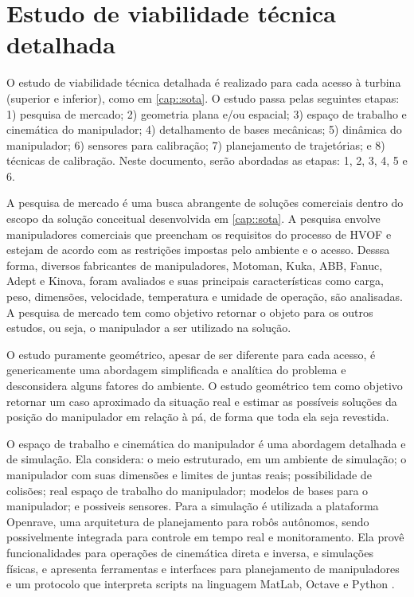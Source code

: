 \section{Estudo de viabilidade técnica detalhada}\label{sec::viatec} 

O estudo de viabilidade técnica detalhada é realizado para cada acesso à turbina
(superior e inferior), como em \ref{cap::sota}. O estudo passa pelas
seguintes etapas: 1) pesquisa de mercado; 2) geometria plana e/ou espacial; 3)
espaço de trabalho e cinemática do manipulador; 4) detalhamento de
bases mecânicas; 5) dinâmica do manipulador; 6) sensores para calibração; 7)
planejamento de trajetórias; e 8) técnicas de calibração.
Neste documento, serão abordadas as etapas: 1, 2, 3, 4, 5 e 6.

A pesquisa de mercado é uma busca abrangente de soluções comerciais dentro do
escopo da solução conceitual desenvolvida em \ref{cap::sota}. A pesquisa envolve
manipuladores comerciais que preencham os requisitos do processo de HVOF e
estejam de acordo com as restrições impostas pelo ambiente e o acesso. Desssa
forma, diversos fabricantes de manipuladores, Motoman, Kuka, ABB, Fanuc,
Adept e Kinova, foram avaliados e suas principais características como carga,
peso, dimensões, velocidade, temperatura e umidade de operação, são analisadas.
A pesquisa de mercado tem como objetivo retornar o objeto para os outros
estudos, ou seja, o manipulador a ser utilizado na solução.

O estudo puramente geométrico, apesar de ser diferente para cada acesso, é
genericamente uma abordagem simplificada e analítica do problema e desconsidera
alguns fatores do ambiente. O estudo geométrico tem como objetivo retornar um caso
aproximado da situação real e estimar as possíveis soluções da posição do
manipulador em relação à pá, de forma que toda ela seja revestida.

O espaço de trabalho e cinemática do manipulador é uma abordagem
detalhada e de simulação. Ela considera: o meio estruturado, em um ambiente de
simulação; o manipulador com suas dimensões e limites de juntas reais;
possibilidade de colisões; real espaço de trabalho do manipulador; modelos de
bases para o manipulador; e possiveis sensores. Para a simulação é utilizada a
plataforma Openrave, uma arquitetura de planejamento para robôs autônomos,
sendo possivelmente integrada para controle em tempo real e monitoramento.
Ela provê funcionalidades para operações de cinemática direta e inversa, e
simulações físicas, e apresenta ferramentas e interfaces para planejamento de
manipuladores e um protocolo que interpreta scripts na linguagem MatLab, Octave
e Python \citep{diankov2008openrave}.

